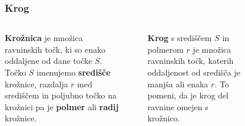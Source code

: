         \begin{frame}
            \frametitle{Krog}

            \begin{columns}
                
                    \pause
                    \begin{alertblock}{}
                        \textbf{Krožnica} je množica ravninskih točk, ki so enako oddaljene od dane točke $S$. Točko $S$ imenujemo \textbf{središče} krožnice, razdalja $r$ med središčem in poljubno točko na krožnici pa je \textbf{polmer} ali \textbf{radij} krožnice.
                    \end{alertblock}
                    ~\\

                    \pause
                    \begin{alertblock}{}
                        \textbf{Krog} s središčem $S$ in polmerom $r$ je množica ravninskih točk, katerih oddaljenost od središča je manjša ali enaka $r$. To pomeni, da je krog del ravnine omejen s krožnico.
                    \end{alertblock}
        
                    \begin{figure}
\end{figure}
\end{columns}
\end{frame}
